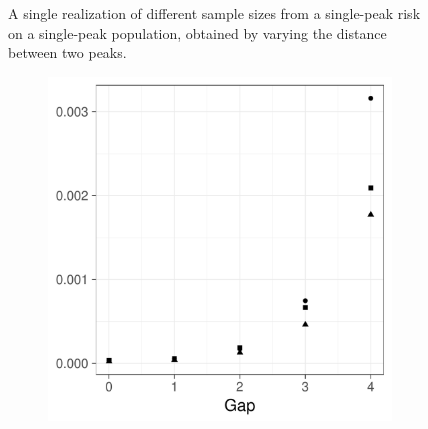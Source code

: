 \begin{figure}[htbp]
\begin{subfigure}{0.45\textwidth}
        \label{fig:one_sample:p1.4_100_Gap_risk:4}
    \end{subfigure}
    \caption[Examples showing distance between population and incident peaks]
        {A single realization of different sample sizes from a single-peak risk on a single-peak population, obtained by varying the distance between two peaks.}
    \label{fig:one_sample:p1.4_100_Gap_risk}
\end{figure}

\begin{figure}[htbp]
    \centering
    \begin{subfigure}[b]{0.49\textwidth}
        \includegraphics[width=\textwidth]{results/by_pop_risk_distance/MISE-vs-population-risk-gap}
        \caption{}
        \label{fig:ise:p1.4_100_Gap_risk:mise}
    \end{subfigure}
    \begin{subfigure}[b]{0.49\textwidth}

\end{subfigure}
\end{figure}
